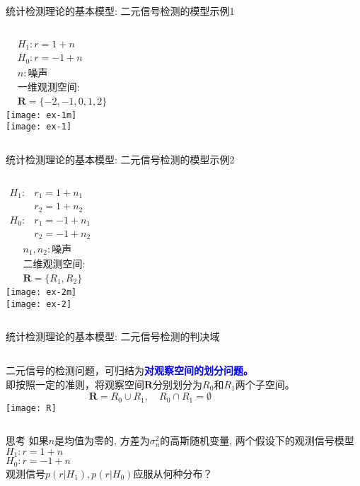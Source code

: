 \begin{frame}{统计检测理论的基本模型: 二元信号检测的模型示例1}
\begin{columns}
	\begin{align*}
	&H_1: r=1+n\\
	&H_0: r=-1+n\\
	&n:\text{噪声}\\
	&\text{一维观测空间:}\\
	&\bm{R}=\{-2,-1,0,1,2\}
	\end{align*}
	\texttt{[image: ex-1m]}\\
	\texttt{[image: ex-1]}
\end{columns}
\end{frame}

\begin{frame}{统计检测理论的基本模型: 二元信号检测的模型示例2}
\begin{columns}
	\begin{align*}
	H_1: &r_1=1+n_1\\
	&r_2=1+n_2\\
	H_0: &r_1=-1+n_1\\
	&r_2=-1+n_2
	\end{align*}
	\begin{align*}
	&n_1,n_2:\text{噪声}\\
	&\text{二维观测空间:}\\
	&\bm{R}=\{R_1,R_2\}
	\end{align*}
	\texttt{[image: ex-2m]}\\
	\texttt{[image: ex-2]}
\end{columns}
\end{frame}

\begin{frame}{统计检测理论的基本模型: 二元信号检测的判决域}
\begin{columns}
	二元信号的检测问题，可归结为\textcolor{blue}{\textbf{对观察空间的划分问题。}}\\
	即按照一定的准则，将观察空间$\bm{R}$分别划分为$R_0$和$R_1$两个子空间。\\
	\[\bm{R}=R_0\cup R_1,\quad R_0\cap R_1=\emptyset \]
	\texttt{[image: R]}\\
\end{columns}
\end{frame}

\begin{frame}
\begin{block}{思考}
	如果$n$是均值为零的, 方差为$\sigma_n^2$的高斯随机变量, 两个假设下的观测信号模型\\
	$H_1: r=1+n$\\
	$H_0: r=-1+n$\\
	观测信号$p(r|H_1),p(r|H_0)$应服从何种分布？
\end{block}
\end{frame}

